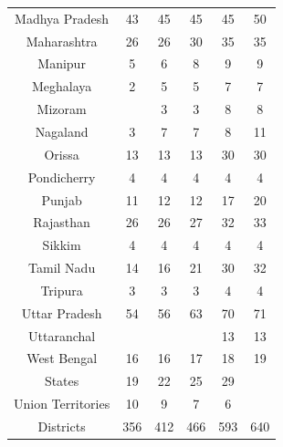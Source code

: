 \documentclass[12pt, a4paper]{article}
\begin{document}
\begin{table}[h!]
{\begin{tabular}{c|ccccc}
			Madhya Pradesh & 43 & 45 & 45 & 45 & 50 \\ 
			Maharashtra & 26 & 26 & 30 & 35 & 35 \\ 
			Manipur & 5 & 6 & 8 & 9 & 9 \\ 
			Meghalaya & 2 & 5 & 5 & 7 & 7 \\ 
			Mizoram &  & 3 & 3 & 8 & 8 \\ 
			Nagaland & 3 & 7 & 7 & 8 & 11 \\ 
			Orissa & 13 & 13 & 13 & 30 & 30 \\ 
			Pondicherry & 4 & 4 & 4 & 4 & 4 \\ 
			Punjab & 11 & 12 & 12 & 17 & 20 \\ 
			Rajasthan & 26 & 26 & 27 & 32 & 33 \\ 
			Sikkim & 4 & 4 & 4 & 4 & 4 \\ 
			Tamil Nadu & 14 & 16 & 21 & 30 & 32 \\ 
			Tripura & 3 & 3 & 3 & 4 & 4 \\ 
			Uttar Pradesh & 54 & 56 & 63 & 70 & 71 \\ 
			Uttaranchal &  &  &  & 13 & 13 \\ 
			West Bengal & 16 & 16 & 17 & 18 & 19 \\ 
			\hline
			States & 19 & 22 & 25 & 29 &  \\ 
			Union Territories & 10 & 9 & 7 & 6 &  \\ 
			Districts & 356 & 412 & 466 & 593 & 640 \\ 
			\hline
		\end{tabular}}
	\end{table}
	
\end{document}

